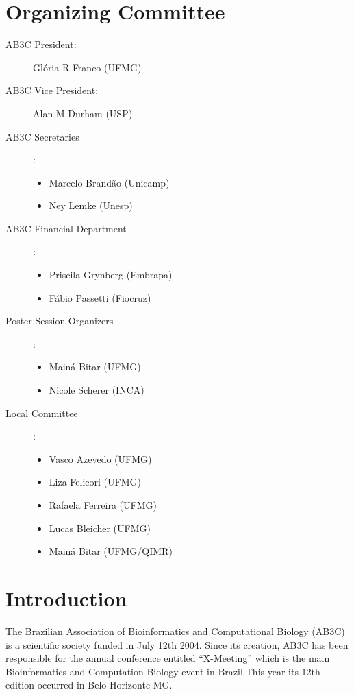 
\chapter{Organizing Committee}

\begin{description}

\item[AB3C President:] Gl\'oria R Franco (UFMG)

\item[AB3C Vice President:] Alan M Durham (USP)


\item[AB3C Secretaries]:

\begin{itemize}
 \item Marcelo Brand\~ao (Unicamp) 
\item  Ney Lemke (Unesp)
\end{itemize}

\item[AB3C Financial Department]:

\begin{itemize}
\item Priscila Grynberg (Embrapa)
\item F\'abio Passetti (Fiocruz)
\end{itemize}

\item[Poster Session Organizers]:

\begin{itemize}
\item Main\'a Bitar (UFMG)
\item Nicole Scherer (INCA)
\end{itemize}

\item[Local Committee]:

\begin{itemize}
\item Vasco Azevedo (UFMG)
\item Liza Felicori (UFMG)
\item Rafaela Ferreira (UFMG)
\item Lucas Bleicher (UFMG)
\item Main\'a  Bitar (UFMG/QIMR)
\end{itemize}
\end{description}
\newpage
\chapter{Introduction}
The Brazilian Association of Bioinformatics and Computational Biology (AB3C) is
a scientific society funded in July 12th 2004.
Since its creation, AB3C has been responsible for the annual conference entitled
“X-Meeting” which is the main Bioinformatics and Computation Biology event in
Brazil.This year its 12th edition occurred in Belo Horizonte MG.

